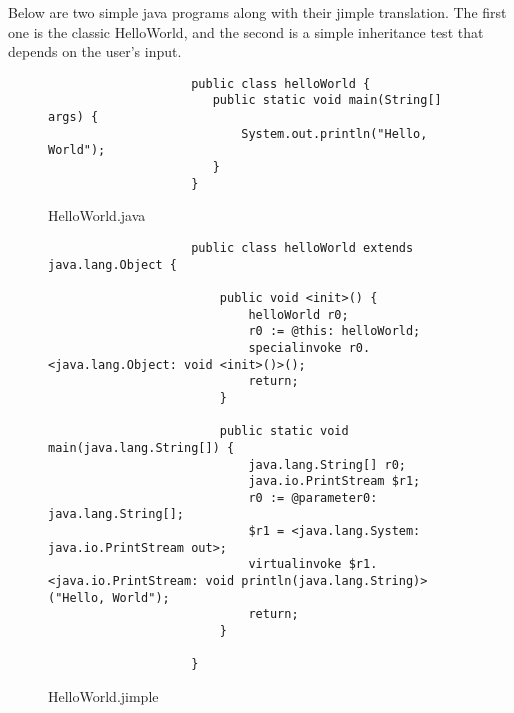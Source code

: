 \documentclass{dithesis}
\begin{document}
        Below are two simple java programs along with their jimple translation. The first one is the classic HelloWorld, and the second is a simple inheritance test that depends on the user's input.
            \begin{figure}[H]
                \begin{lstlisting}
                    public class helloWorld {
                       public static void main(String[] args) {
                           System.out.println("Hello, World");
                       }
                    }
                \end{lstlisting}
            \caption{HelloWorld.java}
            \end{figure}
            \begin{figure}[H]
                \begin{lstlisting}
                    public class helloWorld extends java.lang.Object {

                        public void <init>() {
                            helloWorld r0;
                            r0 := @this: helloWorld;
                            specialinvoke r0.<java.lang.Object: void <init>()>();
                            return;
                        }

                        public static void main(java.lang.String[]) {
                            java.lang.String[] r0;
                            java.io.PrintStream $r1;
                            r0 := @parameter0: java.lang.String[];
                            $r1 = <java.lang.System: java.io.PrintStream out>;
                            virtualinvoke $r1.<java.io.PrintStream: void println(java.lang.String)>("Hello, World");
                            return;
                        }

                    }
                \end{lstlisting}
            \caption{HelloWorld.jimple}
            \end{figure}
\end{document}
